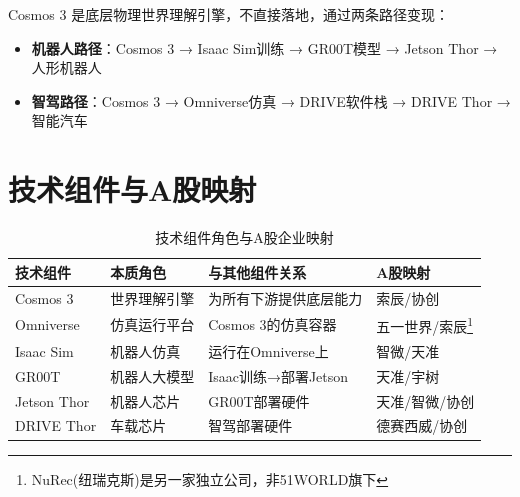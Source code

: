 Cosmos 3 是底层物理世界理解引擎，不直接落地，通过两条路径变现：

\begin{itemize}[leftmargin=2em]
  \item \textbf{机器人路径}：Cosmos 3 → Isaac Sim训练 → GR00T模型 → Jetson Thor → 人形机器人
  \item \textbf{智驾路径}：Cosmos 3 → Omniverse仿真 → DRIVE软件栈 → DRIVE Thor → 智能汽车
\end{itemize}

\section{技术组件与A股映射}

\begin{table}[H]
\centering
\small
\renewcommand{\arraystretch}{1.25}
\begin{tabularx}{\textwidth}{l l X l}
\toprule
\textbf{技术组件} & \textbf{本质角色} & \textbf{与其他组件关系} & \textbf{A股映射} \\
\midrule
Cosmos 3 & 世界理解引擎 & 为所有下游提供底层能力 & 索辰/协创 \\
Omniverse & 仿真运行平台 & Cosmos 3的仿真容器 & 五一世界/索辰\footnote{NuRec(纽瑞克斯)是另一家独立公司，非51WORLD旗下} \\
Isaac Sim & 机器人仿真 & 运行在Omniverse上 & 智微/天准 \\
GR00T & 机器人大模型 & Isaac训练→部署Jetson & 天准/宇树 \\
Jetson Thor & 机器人芯片 & GR00T部署硬件 & 天准/智微/协创 \\
DRIVE Thor & 车载芯片 & 智驾部署硬件 & 德赛西威/协创 \\
\bottomrule
\end{tabularx}
\caption{技术组件角色与A股企业映射}
\end{table}

